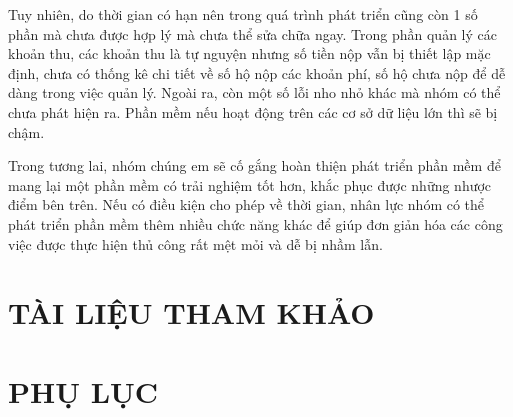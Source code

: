 \documentclass{article}
\begin{document}
Tuy nhiên, do thời gian có hạn nên trong quá trình phát triển cũng còn 1 số phần mà chưa được hợp lý mà chưa thể sửa chữa ngay. Trong phần quản lý các khoản thu, các khoản thu là tự nguyện nhưng số tiền nộp vẫn bị thiết lập mặc định, chưa có thống kê chi tiết về số hộ nộp các khoản phí, số hộ chưa nộp để dễ dàng trong việc quản lý. Ngoài ra, còn một số lỗi nho nhỏ khác mà nhóm có thể chưa phát hiện ra.
Phần mềm nếu hoạt động trên các cơ sở dữ liệu lớn thì sẽ bị chậm.

Trong tương lai, nhóm chúng em sẽ cố gắng hoàn thiện phát triển phần mềm để mang lại một phần mềm có trải nghiệm tốt hơn, khắc phục được những nhược điểm bên trên. Nếu có điều kiện cho phép về thời gian, nhân lực nhóm có thể phát triển phần mềm thêm nhiều chức năng khác để giúp đơn giản hóa các công việc được thực hiện thủ công rất mệt mỏi và dễ bị nhầm lẫn.
\newpage

\section*{TÀI LIỆU THAM KHẢO}
\newpage

\section*{PHỤ LỤC}
\end{document}
